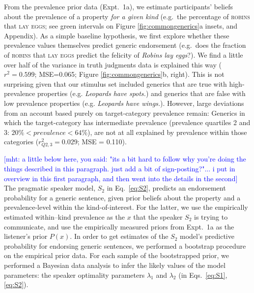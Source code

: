 \documentclass[12pt,letterpaper]{article}
\newcommand{\ndg}[1]{\textcolor{Green}{[ndg: #1]}}
\newcommand{\mht}[1]{\textcolor{Blue}{[mht: #1]}}
\begin{document}
 
 
From the prevalence prior data (Expt.~1a), we estimate participants' beliefs about the prevalence of a property \emph{for a given kind} (e.g.~the percentage of \textsc{robins} that \textsc{lay eggs}; see green intervals on Figure \ref{fig:commongenerics}a insets, and Appendix).
As a simple baseline hypothesis, we first explore whether these prevalence values themselves predict generic endorsement (e.g.~does the fraction of \textsc{robins} that \textsc{lay eggs} predict the felicity of \emph{Robins lay eggs}?).
We find a little over half of the variance in truth judgments data is explained this way ($r^2 = 0.599$; MSE=0.065; Figure \ref{fig:commongenerics}b, right). 
This is not surprising given that our stimulus set included generics that are true with high-prevalence properties (e.g. \emph{Leopards have spots.}) and  generics that are false with low prevalence properties (e.g. \emph{Leopards have wings.}). 
However, large deviations from an account based purely on target-category prevalence remain: Generics in which the target-category has intermediate prevalence (prevalence quartiles 2 and 3: $ 20\% < prevalence < 64\%$), are not at all explained by prevalence within those categories ($r_{Q2,3}^2 = 0.029$; MSE = 0.110).


\mht{a little below here, you said: "its a bit hard to follow why you're doing the things described in this paragraph. just add a bit of sign-posting?"... i put in overview in this first paragraph, and then went into the details in the second}
The pragmatic speaker model, $S_2$ in Eq.~\ref{eq:S2}, predicts an endorsement probability for a generic sentence, given prior beliefs about the property and a prevalence-level within the kind-of-interest. 
For the latter, we use the empirically estimated within--kind prevalence as the $x$ that the speaker $S_2$ is trying to communicate, and use the empirically measured priors from Expt.~1a as the listener's prior $P(x)$. 
In order to get estimates of the $S_2$ model's predictive probability for endorsing generic sentences, we performed a bootstrap procedure on the empirical prior data. For each sample of the bootstrapped prior, we performed a Bayesian data analysis to infer the likely values of the model parameters: the speaker optimality parameters $\lambda_1$ and $\lambda_2$ (in Eqs.~\ref{eq:S1}, \ref{eq:S2}). 
\end{document}
